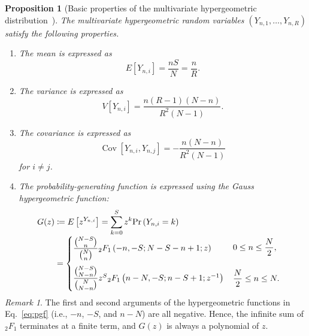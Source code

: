 \documentclass[pre, amsmath, floatfix]{revtex4-2}
\theoremstyle{plain}
\newtheorem{proposition}{Proposition}[section]
\theoremstyle{definition}
\theoremstyle{remark}
\newtheorem{remark}{Remark}[section]
\newcommand{\Prob}[1]{\mathrm{Pr}\left(#1\right)} %
\newcommand{\E}[1]{E\left[#1\right]} %
\newcommand{\Var}[1]{V\left[#1\right]} %
\DeclareMathOperator{\cov}{Cov} %
\newcommand{\Cov}[2]{\cov\left[#1, #2\right]}
\newcommand{\GaussFsymbol}{{}_2F_1} %
\newcommand{\GaussF}[4]{\GaussFsymbol\left(#1, #2; #3; #4\right)} %
\begin{document}
\begin{proposition}[Basic properties of the multivariate hypergeometric distribution~\cite{Bishop, Yamamoto}]\label{prop3.1}
\renewcommand{\labelenumi}{$(\mathrm{\alph{enumi}})$}
\renewcommand{\theenumi}{\labelenumi}
The multivariate hypergeometric random variables $(Y_{n,1},\ldots,Y_{n,R})$ satisfy the following properties.
\begin{enumerate}
\item\label{prop3.1-a} The mean is expressed as
\begin{equation}
\E{Y_{n,i}}=\frac{nS}{N}=\frac{n}{R}.
\label{eq:hg_mean}
\end{equation}
\item The variance is expressed as
\[
\Var{Y_{n,i}}=\frac{n(R-1)(N-n)}{R^2(N-1)}.
\]
\item The covariance is expressed as
\[
\Cov{Y_{n,i}}{Y_{n,j}}=-\frac{n(N-n)}{R^2(N-1)}
\]
for $i\ne j$.
\item The probability-generating function is expressed using the Gauss hypergeometric function:
\begin{subequations}\label{eq:pgf}
\begin{align}
G(z)&\coloneqq\E{z^{Y_{n,i}}}=\sum_{k=0}^S z^k \Prob{Y_{n,i}=k}\nonumber\\
& && 0\le n\le \dfrac{N}{2},\label{eq:pgf-1}\\
&=
\smash{\left\{\begin{array}{@{}l@{}}
\dfrac{\binom{N-S}{n}}{\binom{N}{n}}\GaussF{-n}{-S}{N-S-n+1}{z}\\[5\jot]
\dfrac{\binom{N-S}{N-n}}{\binom{N}{N-n}}z^S\GaussF{n-N}{-S}{n-S+1}{z^{-1}}
\end{array}\right.} &&\notag\\[-\jot]
& && \dfrac{N}{2}\le n\le N.\label{eq:pgf-2}
\end{align}
\end{subequations}
\end{enumerate}

\end{proposition}

\begin{remark}
The first and second arguments of the hypergeometric functions in Eq.~\eqref{eq:pgf} (i.e., $-n$, $-S$, and $n-N$) are all negative.
Hence, the infinite sum of $\GaussFsymbol$ terminates at a finite term, and $G(z)$ is always a polynomial of $z$.
\end{remark}
\end{document}
